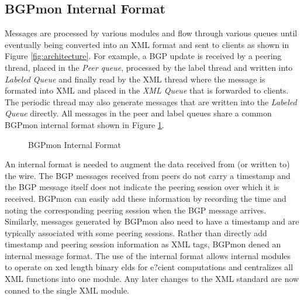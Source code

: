 \subsection{BGPmon Internal Format}
Messages are processed by various modules and flow through various queues until eventually being converted into an XML format and sent to clients as shown in Figure \ref{fig:architecture}.   For example, a BGP update is received by a peering thread,  placed in the \emph{Peer queue}, processed by the label thread and written into \emph{Labeled Queue} and finally read by the XML thread where the message is formated into XML and placed in the  \emph{XML Queue} that is forwarded to clients.    The periodic thread may also generate messages that are written into the \emph{Labeled Queue} directly.   All messages in the peer and label queues share a common BGPmon internal format shown in Figure \ref{fig:BMF}.    

\begin{figure}[!htb]
\centering
{}
\caption{BGPmon Internal Format}
\label{fig:BMF}
\end{figure}
An internal format is needed to augment the data received from (or written to) the wire. The BGP messages received from peers do not carry a timestamp and the BGP message itself does not indicate the peering session over which it is received. BGPmon can easily add these information by recording the time and noting the corresponding peering session when the BGP message arrives. Similarly, messages generated by BGPmon also need to have a timestamp and are typically associated with some peering sessions. Rather than directly add timestamp and peering session information as XML tags, BGPmon dened an internal message format. The use of the internal format allows internal modules to operate on xed length binary elds for e?cient computations and centralizes all XML functions into one module. Any later changes to the XML standard are now conned to the single XML module.

